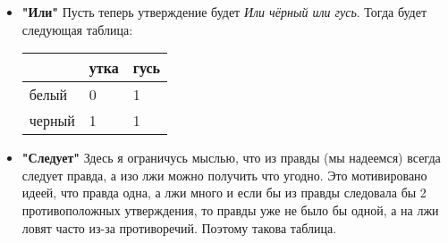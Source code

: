 \documentclass{article}
\begin{document}
\begin{enumerate}
\begin{itemize}
            \item \textbf{"Или"} Пусть теперь утверждение будет \emph{Или
                чёрный или гусь}. Тогда будет следующая таблица:\par
                \begin{center}
                    \begin{tabular}{|p{1cm}|p{1cm}|p{1cm}|}
                        \hline
                        & утка & гусь\\
                        \hline
                        белый & 0 & 1\\
                        \hline
                        черный & 1 & 1\\
                        \hline
                    \end{tabular}
                \end{center}
            \item \textbf{"Следует"} Здесь я ограничусь мыслью, что из правды
                (мы надеемся) всегда следует правда, а изо лжи можно получить
                что угодно. Это мотивировано идеей, что правда одна, а лжи
                много и если бы из правды следовала бы 2 противоположных
                утверждения, то правды уже не было бы одной, а на лжи ловят
                часто из-за противоречий. Поэтому такова таблица.
        \end{itemize}
\end{enumerate}
\end{document}
